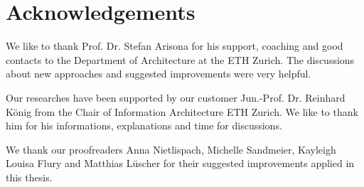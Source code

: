 \section{Acknowledgements}

We like to thank Prof. Dr. Stefan Arisona for his support, coaching and good contacts to the Department of Architecture at the ETH Zurich. The discussions about new approaches and suggested improvements were very helpful.

Our researches have been supported by our customer Jun.-Prof. Dr. Reinhard König from the Chair of Information Architecture ETH Zurich. We like to thank him for his informations, explanations and time for discussions.

We thank our proofreaders Anna Nietlispach, Michelle Sandmeier, Kayleigh Louisa Flury and Matthias Lüscher for their suggested improvements applied in this thesis.